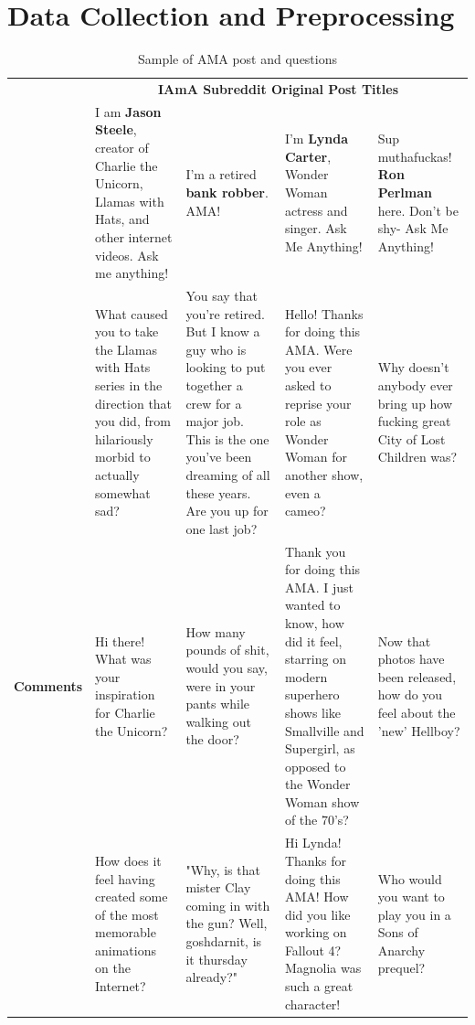 \documentclass[paper=a4, fontsize=11pt]{scrartcl}
\numberwithin{equation}{section}		%
\numberwithin{figure}{section}			%
\numberwithin{table}{section}				%
\begin{document}
\section{Data Collection and Preprocessing}
\begin{table}
\centering
\scriptsize
\begin{tabular}{lm{2.5cm}m{2.5cm}m{2.5cm}m{2.5cm}}
  \hline
   & \multicolumn{4}{c}{\textbf{IAmA Subreddit Original Post Titles}} \\
  \cline{2-5}
   & I am  \textbf{Jason Steele}, creator of Charlie the Unicorn, Llamas with Hats, and other internet videos. Ask me anything! & I'm a retired  \textbf{bank robber}. AMA! & I’m  \textbf{Lynda Carter}, Wonder Woman actress and singer. Ask Me Anything! & Sup muthafuckas!  \textbf{Ron Perlman} here. Don’t be shy- Ask Me Anything! \\
   \cline{2-5}
   \cline{2-5}
    & What caused you to take the Llamas with Hats series in the direction that you did, from hilariously morbid to actually somewhat sad? & You say that you're retired. But I know a guy who is looking to put together a crew for a major job. This is the one you've been dreaming of all these years. Are you up for one last job? & Hello! Thanks for doing this AMA. Were you ever asked to reprise your role as Wonder Woman for another show, even a cameo? & Why doesn't anybody ever bring up how fucking great City of Lost Children was? \\
   \cline{2-5}
   \textbf{Comments} & Hi there! What was your inspiration for Charlie the Unicorn? & How many pounds of shit, would you say, were in your pants while walking out the door? & Thank you for doing this AMA. I just wanted to know, how did it feel, starring on modern superhero shows like Smallville and Supergirl, as opposed to the Wonder Woman show of the 70's? & Now that photos have been released, how do you feel about the 'new' Hellboy? \\
    \cline{2-5}
   & How does it feel having created some of the most memorable animations on the Internet?  & "Why, is that mister Clay coming in with the gun? Well, goshdarnit, is it thursday already?" & Hi Lynda! Thanks for doing this AMA! How did you like working on Fallout 4? Magnolia was such a great character! & Who would you want to play you in a Sons of Anarchy prequel? \\
  \hline
  \hline
  \end{tabular}
  \caption{Sample of AMA post and questions}
  \label{tab:ama_sample}
\end{table}
\end{document}
